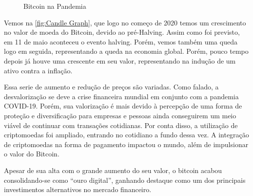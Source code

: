 
\begin{figure}[h]
    \centering
    \caption{Bitcoin na Pandemia}
    \label{fig:pandemia}
\end{figure}

Vemos na \cref{fig:Candle Graph}, que logo no começo de 2020 temos um crescimento no valor de moeda do Bitcoin, devido ao pré-Halving. Assim como foi previsto, em 11 de maio aconteceu o evento halving. Porém, vemos também uma queda logo em seguida, representando a queda na economia global. Porém, pouco tempo depois já houve uma crescente em seu valor, representando na indução de um ativo contra a inflação.

\newpage 

Essa serie de aumento e redução de preços são variadas. Como falado, a desvalorização se deve a crise financeira mundial em conjunto com a pandemia COVID-19. Porém, sua valorização é mais devido à percepção de uma forma de proteção e diversificação para empresas e pessoas ainda conseguirem um meio viável de continuar com transações cotidianas. Por conta disso, a utilização de criptomoedas foi ampliado, entrando no cotidiano a fundo dessa vez. A integração de criptomoedas na forma de pagamento impactou o mundo, além de impulsionar o valor do Bitcoin.

Apesar de sua alta com o grande aumento do seu valor, o bitcoin acabou consolidando-se como “ouro digital”, ganhando destaque como um dos principais investimentos alternativos no mercado financeiro.
